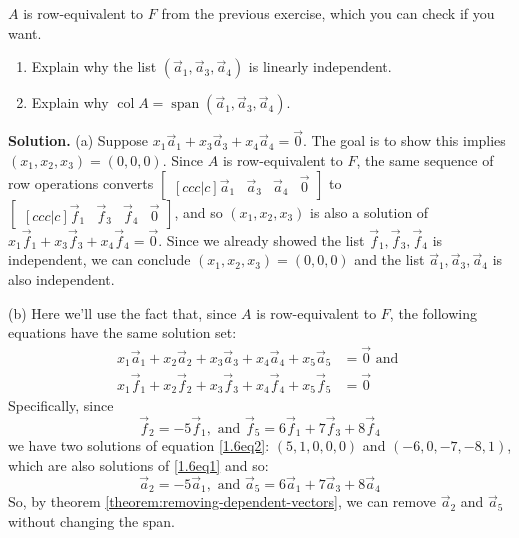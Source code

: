 \documentclass[11pt, letterpaper]{report}
\newenvironment{book}{}{}
\newcounter{exercise}[section]
\newcounter{theorem}[chapter]
\DeclareMathOperator{\col}{col}
\DeclareMathOperator{\spn}{span}
\begin{document}
$A$ is row-equivalent to $F$ from the previous exercise, which you can check if you want.
\begin{enumerate}[label=(\alph*)]
\item Explain why the list $( \vec{a}_1, \vec{a}_3, \vec{a}_4 )$ is linearly independent.
\item Explain why $\col A = \spn ( \vec{a}_1,\vec{a}_3,\vec{a}_4 )$.
\end{enumerate}

\begin{book}
\textbf{Solution.} (a) Suppose $x_1\vec{a}_1+x_3\vec{a}_3+x_4\vec{a}_4=\vec{0}$. The goal is to show this implies $(x_1,x_2,x_3) = (0,0,0)$. Since $A$ is row-equivalent to $F$, the same sequence of row operations converts $\begin{bmatrix}[ccc|c]
\vec{a}_1 & \vec{a}_3 & \vec{a}_4 & \vec{0}
\end{bmatrix}$ to $\begin{bmatrix}[ccc|c]
\vec{f}_1 & \vec{f}_3 & \vec{f}_4 & \vec{0}
\end{bmatrix}$, and so $(x_1,x_2,x_3)$ is also a solution of $x_1\vec{f}_1+x_3\vec{f}_3+x_4\vec{f}_4=\vec{0}$. Since we already showed the list $\vec{f}_1,\vec{f}_3,\vec{f}_4$ is independent, we can conclude $(x_1,x_2,x_3) = (0,0,0)$ and the list $\vec{a}_1,\vec{a}_3,\vec{a}_4$ is also independent.

(b) Here we'll use the fact that, since $A$ is row-equivalent to $F$, the following equations have the same solution set:
\begin{align}
x_1\vec{a}_1+x_2\vec{a}_2+x_3\vec{a}_3+x_4\vec{a}_4+x_5\vec{a}_5 &= \vec{0} \text{ and } \label{1.6eq1}\\
x_1\vec{f}_1+x_2\vec{f}_2+x_3\vec{f}_3+x_4\vec{f}_4+x_5\vec{f}_5 &= \vec{0} \label{1.6eq2}
\end{align}
Specifically, since 
\begin{equation}
\label{eq:1.6eq3}
\vec{f}_2=-5\vec{f}_1,\text{ and }\vec{f}_5=6\vec{f}_1+7\vec{f}_3+8\vec{f}_4
\end{equation}
we have two solutions of equation \ref{1.6eq2}: $(5,1,0,0,0)$ and $(-6,0,-7,-8,1)$, which are also solutions of \ref{1.6eq1} and so:
\begin{equation}
\label{eq:1.64}
\vec{a}_2=-5\vec{a}_1,\text{ and }\vec{a}_5=6\vec{a}_1+7\vec{a}_3+8\vec{a}_4\end{equation}
So, by theorem \ref{theorem:removing-dependent-vectors}, we can remove $\vec{a}_2$ and $\vec{a}_5$ without changing the span. \hfill \blacksquare
\end{book}
\end{document}
